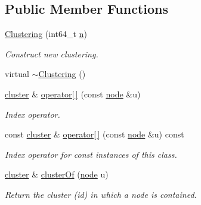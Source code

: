 \subsection*{Public Member Functions}
\begin{DoxyCompactItemize}
\item 
\hyperlink{class_ensemble_clustering_1_1_clustering_a2bc47b6f0c935be840d4f12fc2043a71}{Clustering} (int64\-\_\-t \hyperlink{class_ensemble_clustering_1_1_node_map_a511baf014428ed1dece45d9ab94f205b}{n})
\begin{DoxyCompactList}\small\item\em Construct new clustering. \end{DoxyCompactList}\item 
virtual \hyperlink{class_ensemble_clustering_1_1_clustering_ad7d81b7dc44d96c4802e1294e3ffbb48}{$\sim$\-Clustering} ()
\item 
\hyperlink{namespace_ensemble_clustering_a5ae38234e207add524443be6e597b970}{cluster} \& \hyperlink{class_ensemble_clustering_1_1_clustering_aaa9d16c93e56a4ea1c6bcf7eb302610a}{operator\mbox{[}$\,$\mbox{]}} (const \hyperlink{namespace_ensemble_clustering_ae829290aeccd1a420b17a37fd901f114}{node} \&u)
\begin{DoxyCompactList}\small\item\em Index operator. \end{DoxyCompactList}\item 
const \hyperlink{namespace_ensemble_clustering_a5ae38234e207add524443be6e597b970}{cluster} \& \hyperlink{class_ensemble_clustering_1_1_clustering_aa277d9365e79e8b2f067e8630a29b031}{operator\mbox{[}$\,$\mbox{]}} (const \hyperlink{namespace_ensemble_clustering_ae829290aeccd1a420b17a37fd901f114}{node} \&u) const 
\begin{DoxyCompactList}\small\item\em Index operator for const instances of this class. \end{DoxyCompactList}\item 
\hyperlink{namespace_ensemble_clustering_a5ae38234e207add524443be6e597b970}{cluster} \& \hyperlink{class_ensemble_clustering_1_1_clustering_ad928bde104aea2f59caadc40aa9fb664}{cluster\-Of} (\hyperlink{namespace_ensemble_clustering_ae829290aeccd1a420b17a37fd901f114}{node} u)
\begin{DoxyCompactList}\small\item\em Return the cluster (id) in which a node is contained. \end{DoxyCompactList}\item 

\end{DoxyCompactItemize}
